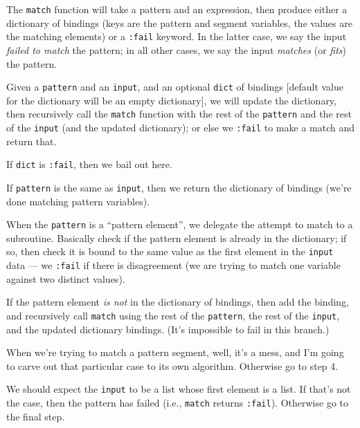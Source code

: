 The \lstinline[language=lisp]{match} function will take a pattern and an
expression, then produce either a dictionary of bindings (keys are the
pattern and segment variables, the values are the matching elements) or
a \lstinline[language=lisp]{:fail} keyword. In the latter case, we say
the input \emph{failed to match} the pattern; in all other cases, we say
the input \emph{matches} (or \emph{fits}) the pattern.

Given a \lstinline[language=lisp]{pattern} and an
\lstinline[language=lisp]{input}, and an optional
\lstinline[language=lisp]{dict} of bindings [default value for the
  dictionary will be an empty dictionary], we will update the
dictionary, then recursively call the
\lstinline[language=lisp]{match} function with
the rest of the \lstinline[language=lisp]{pattern} and the rest of the
\lstinline[language=lisp]{input} (and the updated dictionary); or else
we \lstinline[language=lisp]{:fail} to make a match and return that.

 If \lstinline[language=lisp]{dict} is
\lstinline[language=lisp]{:fail}, then we bail out here.

 If
\lstinline[language=lisp]{pattern} is the same as
\lstinline[language=lisp]{input}, then we return the dictionary of
bindings (we're done matching pattern variables).

 When the
\lstinline[language=lisp]{pattern} is a ``pattern element'',
we delegate the attempt to match to a subroutine. Basically check if the
pattern element is already in the dictionary; if so, then check it is
bound to the same value as the first element in the
\lstinline[language=lisp]{input} data --- we \lstinline[language=lisp]{:fail}
if there is disagreement (we are trying to match one variable against
two distinct values).

If the pattern element \emph{is not} in the dictionary of bindings, then
add the binding, and recursively call \lstinline[language=lisp]{match}
using the rest of the \lstinline[language=lisp]{pattern},
the rest of the \lstinline[language=lisp]{input}, and the updated
dictionary bindings. (It's impossible to fail in this branch.)

 When we're trying to match a pattern segment, well, it's a
mess, and I'm going to carve out that particular case to its own
algorithm. Otherwise go to step 4.

We should expect the
\lstinline[language=lisp]{input} to be a list whose first element is a list.
If that's not the case, then the pattern has failed (i.e.,
\lstinline[language=lisp]{match} returns \lstinline[language=lisp]{:fail}).
Otherwise go to the final step.

